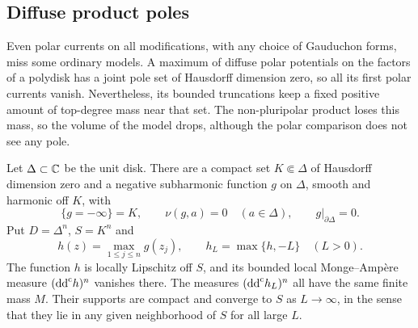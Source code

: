 \subsection{Diffuse product poles}
\label{subsec:diffuse-product-polar-obstruction}

Even polar currents on all modifications, with any choice of Gauduchon forms, miss some ordinary models. A maximum of diffuse polar potentials on the factors of a polydisk has a joint pole set of Hausdorff dimension zero, so all its first polar currents vanish. Nevertheless, its bounded truncations keep a fixed positive amount of top-degree mass near that set. The non-pluripolar product loses this mass, so the volume of the model drops, although the polar comparison does not see any pole.

\begin{lemma}\label{lem:diffuse-product-truncation-mass}
Let $\Delta\subset\mathbb C$ be the unit disk. There are a compact set $K\Subset\Delta$ of Hausdorff dimension zero and a negative subharmonic function $g$ on $\Delta$, smooth and harmonic off $K$, with
\[
 \{g=-\infty\}=K,\qquad \nu(g,a)=0\quad(a\in\Delta),
 \qquad g|_{\partial\Delta}=0.
\]
Put $D=\Delta^n$, $S=K^n$ and
\[
 h(z)=\max_{1\leq j\leq n}g(z_j),\qquad
 h_L=\max\{h,-L\}\quad(L>0).
\]
The function $h$ is locally Lipschitz off $S$, and its bounded local Monge--Amp\`ere measure $(\mathrm{dd}^{\mathrm{c}} h)^n$ vanishes there. The measures $(\mathrm{dd}^{\mathrm{c}} h_L)^n$ all have the same finite mass $M$. Their supports are compact and converge to $S$ as $L\to\infty$, in the sense that they lie in any given neighborhood of $S$ for all large $L$.
\end{lemma}
